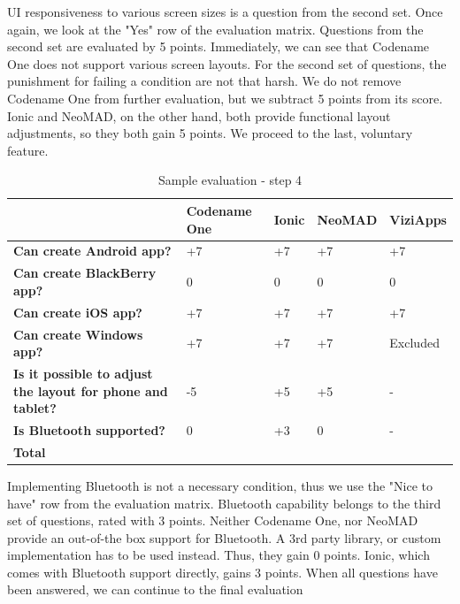 \documentclass[english,master,public,dept460,male,cpdeclaration,oneside]{diploma}
\begin{document}
UI responsiveness to various screen sizes is a question from the second set. Once again, we look at the "Yes" row of the evaluation matrix. Questions from the second set are evaluated by 5 points. Immediately, we can see that Codename One does not support various screen layouts. For the second set of questions, the punishment for failing a condition are not that harsh. We do not remove Codename One from further evaluation, but we subtract 5 points from its score. Ionic and NeoMAD, on the other hand, both provide functional layout adjustments, so they both gain 5 points. We proceed to the last, voluntary feature.

\begin{table}[!h]
	\centering
	\caption{Sample evaluation - step 4}
	\begin{tabular}{p{2.5cm} | p{2.5cm} | p{2.5cm} | p{2.5cm} | p{2.5cm}}
		\toprule
		& \textbf{Codename One} & \textbf{Ionic} & \textbf{NeoMAD} & \textbf{ViziApps} \\
		\midrule
		\textbf{Can create Android app?} & +7 & +7 & +7 & +7 \\
		\textbf{Can create BlackBerry app?} & 0 & 0 & 0 & 0 \\
		\textbf{Can create iOS app?} & +7 & +7 & +7 & +7 \\
		\textbf{Can create Windows app?} & +7 & +7 & +7 & Excluded \\
		\midrule
		\textbf{Is it possible to adjust the layout for phone and tablet?} & -5 & +5 & +5 & - \\
		\midrule
		\textbf{Is Bluetooth supported?} & 0 & +3 & 0 & - \\
		\midrule
		\textbf{Total} &&&& \\
		\midrule
	\end{tabular}
\end{table}

Implementing Bluetooth is not a necessary condition, thus we use the "Nice to have" row from the evaluation matrix. Bluetooth capability belongs to the third set of questions, rated with 3 points. Neither Codename One, nor NeoMAD provide an out-of-the box support for Bluetooth. A 3rd party library, or custom implementation has to be used instead. Thus, they gain 0 points. Ionic, which comes with Bluetooth support directly, gains 3 points. When all questions have been answered, we can continue to the final evaluation
\end{document}
